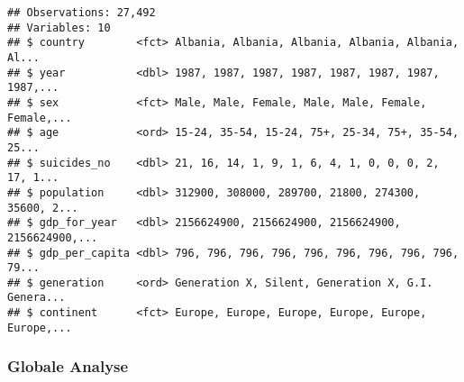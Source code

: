 \documentclass[]{article}
\begin{document}
\begin{verbatim}
## Observations: 27,492
## Variables: 10
## $ country        <fct> Albania, Albania, Albania, Albania, Albania, Al...
## $ year           <dbl> 1987, 1987, 1987, 1987, 1987, 1987, 1987, 1987,...
## $ sex            <fct> Male, Male, Female, Male, Male, Female, Female,...
## $ age            <ord> 15-24, 35-54, 15-24, 75+, 25-34, 75+, 35-54, 25...
## $ suicides_no    <dbl> 21, 16, 14, 1, 9, 1, 6, 4, 1, 0, 0, 0, 2, 17, 1...
## $ population     <dbl> 312900, 308000, 289700, 21800, 274300, 35600, 2...
## $ gdp_for_year   <dbl> 2156624900, 2156624900, 2156624900, 2156624900,...
## $ gdp_per_capita <dbl> 796, 796, 796, 796, 796, 796, 796, 796, 796, 79...
## $ generation     <ord> Generation X, Silent, Generation X, G.I. Genera...
## $ continent      <fct> Europe, Europe, Europe, Europe, Europe, Europe,...
\end{verbatim}

\hypertarget{globale-analyse}{%
\subsubsection{Globale Analyse}\label{globale-analyse}}
\end{document}
